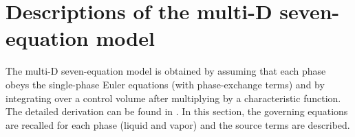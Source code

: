 \section{Descriptions of the multi-D seven-equation model}\label{sec:multi-seven-equ-model}

The multi-D seven-equation model is obtained by assuming that each phase obeys the single-phase Euler equations (with phase-exchange terms) and by integrating over a control volume after multiplying by a characteristic function. The detailed derivation can be found in \cite{SEM}. In this section, the governing equations are recalled for each phase (liquid and vapor) and the source terms are described. 
